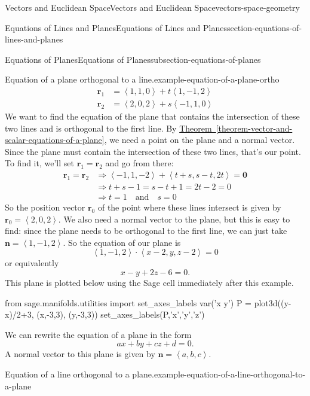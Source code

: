 \documentclass[oneside,10pt,]{book}
\numberwithin{equation}{section}
\newcommand{\vv}[1]{\mathbf{#1}}
\newcommand{\dotprod}[1]{\left\langle #1 \right\rangle}
\begin{document}
\begin{chapterptx}{Vectors and Euclidean Space}{}{Vectors and Euclidean Space}{}{}{vectors-space-geometry}
\begin{sectionptx}{Equations of Lines and Planes}{}{Equations of Lines and Planes}{}{}{section-equations-of-lines-and-planes}
\begin{subsectionptx}{Equations of Planes}{}{Equations of Planes}{}{}{subsection-equations-of-planes}
\begin{example}{Equation of a plane orthogonal to a line.}{example-equation-of-a-plane-ortho}
\begin{align*}
\vv{r}_{1} & = \dotprod{1,1,0} + t\dotprod{1,-1,2} \\
\vv{r}_{2} & = \dotprod{2,0,2} + s\dotprod{-1,1,0} 
\end{align*}
\hypertarget{p-1222}{}%
We want to find the equation of the plane that contains the intersection of these two lines and is orthogonal to the first line. By \hyperref[theorem-vector-and-scalar-equations-of-a-plane]{Theorem~\ref{theorem-vector-and-scalar-equations-of-a-plane}}, we need a point on the plane and a normal vector. Since the plane must contain the intersection of these two lines, that's our point. To find it, we'll set \(\vv{r}_{1} = \vv{r}_{2}\) and go from there:%
%
\begin{align*}
\vv{r}_{1}=\vv{r}_{2} & \Rightarrow \dotprod{-1,1,-2} + \dotprod{t+s,s-t,2t} = \vv{0} \\
& \Rightarrow t+s-1 = s-t+1 = 2t-2 = 0 \\
& \Rightarrow t = 1\quad\text{and}\quad s=0 
\end{align*}
\hypertarget{p-1223}{}%
So the position vector \(\vv{r}_{0}\) of the point where these lines intersect is given by \(\vv{r}_{0} = \dotprod{2,0,2}\). We also need a normal vector to the plane, but this is easy to find: since the plane needs to be orthogonal to the first line, we can just take \(\vv{n} = \dotprod{1,-1,2}\). So the equation of our plane is%
%
\begin{equation*}
\dotprod{1,-1,2}\cdot\dotprod{x-2,y,z-2} = 0
\end{equation*}
\hypertarget{p-1224}{}%
or equivalently%
%
\begin{equation*}
x-y+2z -6 = 0.
\end{equation*}
\hypertarget{p-1225}{}%
This plane is plotted below using the Sage cell immediately after this example.%
\end{example}
\begin{sageinput}
from sage.manifolds.utilities import set_axes_labels
var('x y')
P = plot3d((y-x)/2+3, (x,-3,3), (y,-3,3)) 
set_axes_labels(P,'x','y','z')
\end{sageinput}
\hypertarget{p-1226}{}%
We can rewrite the equation of a plane in the form%
%
\begin{equation*}
ax+by+cz+d = 0.
\end{equation*}
\hypertarget{p-1227}{}%
A normal vector to this plane is given by \(\vv{n} = \dotprod{a,b,c}\).%
\begin{example}{Equation of a line orthogonal to a plane.}{example-equation-of-a-line-orthogonal-to-a-plane}%

\end{example}
\end{subsectionptx}
\end{sectionptx}
\end{chapterptx}
\end{document}
